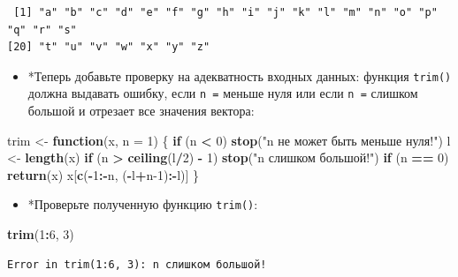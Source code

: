 \documentclass[
]{book}
\newenvironment{Shaded}{\begin{snugshade}}{\end{snugshade}}
\newcommand{\ControlFlowTok}[1]{\textcolor[rgb]{0.13,0.29,0.53}{\textbf{#1}}}
\newcommand{\DataTypeTok}[1]{\textcolor[rgb]{0.13,0.29,0.53}{#1}}
\newcommand{\DecValTok}[1]{\textcolor[rgb]{0.00,0.00,0.81}{#1}}
\newcommand{\KeywordTok}[1]{\textcolor[rgb]{0.13,0.29,0.53}{\textbf{#1}}}
\newcommand{\NormalTok}[1]{#1}
\newcommand{\OperatorTok}[1]{\textcolor[rgb]{0.81,0.36,0.00}{\textbf{#1}}}
\newcommand{\StringTok}[1]{\textcolor[rgb]{0.31,0.60,0.02}{#1}}
\providecommand{\tightlist}{%
  \setlength{\itemsep}{0pt}\setlength{\parskip}{0pt}}
\begin{document}
\begin{verbatim}
 [1] "a" "b" "c" "d" "e" "f" "g" "h" "i" "j" "k" "l" "m" "n" "o" "p" "q" "r" "s"
[20] "t" "u" "v" "w" "x" "y" "z"
\end{verbatim}

\begin{itemize}
\tightlist
\item
  *Теперь добавьте проверку на адекватность входных данных: функция \texttt{trim()} должна выдавать ошибку, если \texttt{n\ =} меньше нуля или если \texttt{n\ =} слишком большой и отрезает все значения вектора:
\end{itemize}

\begin{Shaded}
\begin{Highlighting}[]
\NormalTok{trim <-}\StringTok{ }\ControlFlowTok{function}\NormalTok{(x, }\DataTypeTok{n =} \DecValTok{1}\NormalTok{) \{}
  \ControlFlowTok{if}\NormalTok{ (n }\OperatorTok{<}\StringTok{ }\DecValTok{0}\NormalTok{) }\KeywordTok{stop}\NormalTok{(}\StringTok{"n не может быть меньше нуля!"}\NormalTok{)}
\NormalTok{  l <-}\StringTok{ }\KeywordTok{length}\NormalTok{(x)}
  \ControlFlowTok{if}\NormalTok{ (n }\OperatorTok{>}\StringTok{ }\KeywordTok{ceiling}\NormalTok{(l}\OperatorTok{/}\DecValTok{2}\NormalTok{) }\OperatorTok{-}\StringTok{ }\DecValTok{1}\NormalTok{) }\KeywordTok{stop}\NormalTok{(}\StringTok{"n слишком большой!"}\NormalTok{)}
  \ControlFlowTok{if}\NormalTok{ (n }\OperatorTok{==}\StringTok{ }\DecValTok{0}\NormalTok{) }\KeywordTok{return}\NormalTok{(x)}
\NormalTok{  x[}\KeywordTok{c}\NormalTok{(}\OperatorTok{-}\DecValTok{1}\OperatorTok{:-}\NormalTok{n, (}\OperatorTok{-}\NormalTok{l}\OperatorTok{+}\NormalTok{n}\DecValTok{-1}\NormalTok{)}\OperatorTok{:-}\NormalTok{l)]}
\NormalTok{\}}
\end{Highlighting}
\end{Shaded}

\begin{itemize}
\tightlist
\item
  *Проверьте полученную функцию \texttt{trim()}:
\end{itemize}

\begin{Shaded}
\begin{Highlighting}[]
\KeywordTok{trim}\NormalTok{(}\DecValTok{1}\OperatorTok{:}\DecValTok{6}\NormalTok{, }\DecValTok{3}\NormalTok{)}
\end{Highlighting}
\end{Shaded}

\begin{verbatim}
Error in trim(1:6, 3): n слишком большой!
\end{verbatim}
\end{document}
